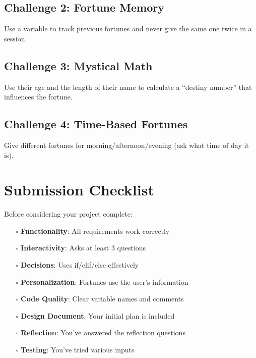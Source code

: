 \documentclass[
  letterpaper,
  DIV=11,
  numbers=noendperiod,
  oneside]{scrreprt}
\providecommand{\tightlist}{%
  \setlength{\itemsep}{0pt}\setlength{\parskip}{0pt}}\usepackage{longtable,booktabs,array}
\begin{document}
\subsection{Challenge 2: Fortune
Memory}\label{challenge-2-fortune-memory}

Use a variable to track previous fortunes and never give the same one
twice in a session.

\subsection{Challenge 3: Mystical Math}\label{challenge-3-mystical-math}

Use their age and the length of their name to calculate a ``destiny
number'' that influences the fortune.

\subsection{Challenge 4: Time-Based
Fortunes}\label{challenge-4-time-based-fortunes}

Give different fortunes for morning/afternoon/evening (ask what time of
day it is).

\section{Submission Checklist}\label{submission-checklist}

Before considering your project complete:

\begin{itemize}
\tightlist
\item[$\square$]
  \textbf{Functionality}: All requirements work correctly
\item[$\square$]
  \textbf{Interactivity}: Asks at least 3 questions
\item[$\square$]
  \textbf{Decisions}: Uses if/elif/else effectively
\item[$\square$]
  \textbf{Personalization}: Fortunes use the user's information
\item[$\square$]
  \textbf{Code Quality}: Clear variable names and comments
\item[$\square$]
  \textbf{Design Document}: Your initial plan is included
\item[$\square$]
  \textbf{Reflection}: You've answered the reflection questions
\item[$\square$]
  \textbf{Testing}: You've tried various inputs
\end{itemize}
\end{document}
